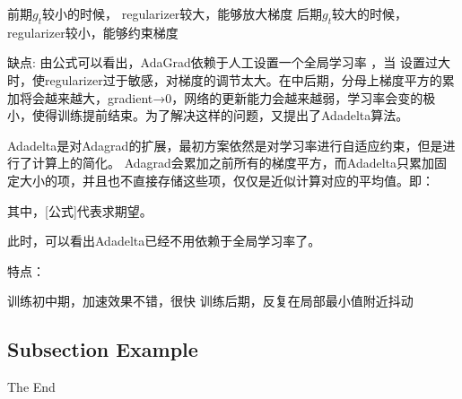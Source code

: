 \documentclass[xcolor=x11names,UTF8]{ctexbeamer}
\begin{document}
  前期$g_t$较小的时候， regularizer较大，能够放大梯度
  后期$g_t$较大的时候，regularizer较小，能够约束梯度

  缺点:
  由公式可以看出，AdaGrad依赖于人工设置一个全局学习率  ，当  设置过大时，使regularizer过于敏感，对梯度的调节太大。在中后期，分母上梯度平方的累加将会越来越大，gradient→0，网络的更新能力会越来越弱，学习率会变的极小，使得训练提前结束。为了解决这样的问题，又提出了Adadelta算法。

  Adadelta是对Adagrad的扩展，最初方案依然是对学习率进行自适应约束，但是进行了计算上的简化。 Adagrad会累加之前所有的梯度平方，而Adadelta只累加固定大小的项，并且也不直接存储这些项，仅仅是近似计算对应的平均值。即：

  其中，[公式]代表求期望。

此时，可以看出Adadelta已经不用依赖于全局学习率了。

特点：

训练初中期，加速效果不错，很快
训练后期，反复在局部最小值附近抖动

\subsection{Subsection Example} %


\begin{frame}
\Huge{\centerline{The End}}
\end{frame}

\end{document}
